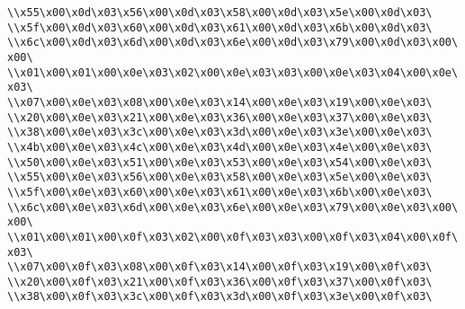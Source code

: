 \verb|\\x55\x00\x0d\x03\x56\x00\x0d\x03\x58\x00\x0d\x03\x5e\x00\x0d\x03\|\newline
\verb|\\x5f\x00\x0d\x03\x60\x00\x0d\x03\x61\x00\x0d\x03\x6b\x00\x0d\x03\|\newline
\verb|\\x6c\x00\x0d\x03\x6d\x00\x0d\x03\x6e\x00\x0d\x03\x79\x00\x0d\x03\x00\x00\|\newline
\verb|\\x01\x00\x01\x00\x0e\x03\x02\x00\x0e\x03\x03\x00\x0e\x03\x04\x00\x0e\x03\|\newline
\verb|\\x07\x00\x0e\x03\x08\x00\x0e\x03\x14\x00\x0e\x03\x19\x00\x0e\x03\|\newline
\verb|\\x20\x00\x0e\x03\x21\x00\x0e\x03\x36\x00\x0e\x03\x37\x00\x0e\x03\|\newline
\verb|\\x38\x00\x0e\x03\x3c\x00\x0e\x03\x3d\x00\x0e\x03\x3e\x00\x0e\x03\|\newline
\verb|\\x4b\x00\x0e\x03\x4c\x00\x0e\x03\x4d\x00\x0e\x03\x4e\x00\x0e\x03\|\newline
\verb|\\x50\x00\x0e\x03\x51\x00\x0e\x03\x53\x00\x0e\x03\x54\x00\x0e\x03\|\newline
\verb|\\x55\x00\x0e\x03\x56\x00\x0e\x03\x58\x00\x0e\x03\x5e\x00\x0e\x03\|\newline
\verb|\\x5f\x00\x0e\x03\x60\x00\x0e\x03\x61\x00\x0e\x03\x6b\x00\x0e\x03\|\newline
\verb|\\x6c\x00\x0e\x03\x6d\x00\x0e\x03\x6e\x00\x0e\x03\x79\x00\x0e\x03\x00\x00\|\newline
\verb|\\x01\x00\x01\x00\x0f\x03\x02\x00\x0f\x03\x03\x00\x0f\x03\x04\x00\x0f\x03\|\newline
\verb|\\x07\x00\x0f\x03\x08\x00\x0f\x03\x14\x00\x0f\x03\x19\x00\x0f\x03\|\newline
\verb|\\x20\x00\x0f\x03\x21\x00\x0f\x03\x36\x00\x0f\x03\x37\x00\x0f\x03\|\newline
\verb|\\x38\x00\x0f\x03\x3c\x00\x0f\x03\x3d\x00\x0f\x03\x3e\x00\x0f\x03\|\newline
